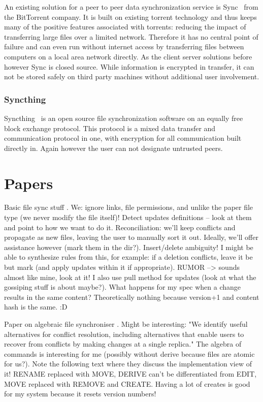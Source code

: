 An existing solution for a peer to peer data synchronization service is Sync~\cite{web:site:bittorrent_sync} from the BitTorrent company.
It is built on existing torrent technology and thus keeps many of the positive features associated with torrents: reducing the impact of transferring large files over a limited network.
Therefore it has no central point of failure and can even run without internet access by transferring files between computers on a local area network directly.
As the client server solutions before however Sync is closed source.
While information is encrypted in transfer, it can not be stored safely on third party machines without additional user involvement.

\subsubsection{Syncthing}

Syncthing~\cite{web:site:synthing} is an open source file synchronization software on an equally free block exchange protocol.
This protocol is a mixed data transfer and communication protocol in one, with encryption for all communication built directly in.
Again however the user can not designate untrusted peers.

\section{Papers}

Basic file sync stuff \cite{balasubramaniam1998file}.
We: ignore links, file permissions, and unlike the paper file type (we never modify the file itself)!
Detect updates definitions – look at them and point to how we want to do it.
Reconciliation: we'll keep conflicts and propagate as new files, leaving the user to manually sort it out.
Ideally, we'll offer assistance however (mark them in the dir?).
Insert/delete ambiguity!
I might be able to synthesize rules from this, for example: if a deletion conflicts, leave it be but mark (and apply updates within it if appropriate).
RUMOR --> sounds almost like mine, look at it!
I also use pull method for updates (look at what the gossiping stuff is about maybe?).
What happens for my spec when a change results in the same content?
Theoretically nothing because version+1 and content hash is the same. :D

Paper on algebraic file synchroniser \cite{ramsey2001algebraic}.
Might be interesting: "We identify useful alternatives for conflict resolution, including alternatives that enable users to recover from conflicts by making changes at a single replica."
The algebra of commands is interesting for me (possibly without derive because files are atomic for us?).
Note the following text where they discuss the implementation view of it!
RENAME replaced with MOVE, DERIVE can't be differentiated from EDIT, MOVE replaced with REMOVE and CREATE.
Having a lot of creates is good for my system because it resets version numbers!

